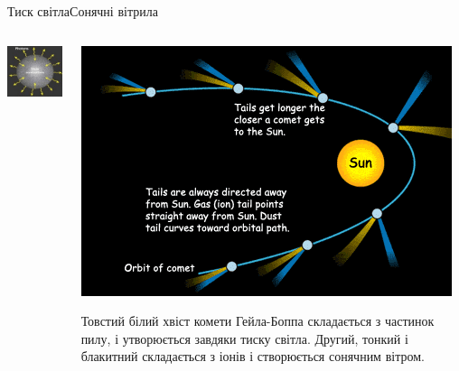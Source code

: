 \documentclass[onlytextwidth]{beamer}
\begin{document}
\begin{frame}{Тиск світла}{Сонячні вітрила}
\begin{onlyenv}
\begin{columns}
\begin{column}{0.5\linewidth}
				\includegraphics[width=0.75\linewidth]{Star}
			\end{column}
			\begin{column}{0.5\linewidth}\centering
				\includegraphics[width=0.75\linewidth]{Comet}

				\begin{block}{}\tiny
					Товстий білий хвіст комети Гейла-Боппа складається з частинок пилу, і утворюється завдяки тиску світла. Другий, тонкий і блакитний складається з іонів і створюється сонячним вітром.
				\end{block}
			\end{column}
		\end{columns}
	\end{onlyenv}
\end{frame}
\end{document}
